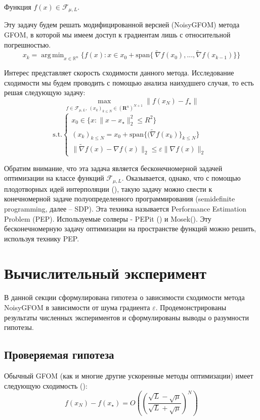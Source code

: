\documentclass{article}
\DeclareMathOperator*{\argmin}{arg\,min}
\begin{document}
Функция $f(x) \in \mathcal{F}_{\mu, L}$.

Эту задачу будем решать модифицированной версией (NoisyGFOM) метода GFOM, в которой мы имеем доступ к градиентам лишь с относительной погрешностью.
\[x_k = \argmin_{x \in \mathbb{R}^n}\{f(x): x \in x_0 + \text{span}\{\ \widetilde{\nabla} f(x_0), ..., \widetilde{\nabla} f(x_{k-1})\}\} \tag{NoisyGFOM}\]

Интерес представляет скорость сходимости данного метода. Исследование сходимости мы будем проводить с помощью анализа наихудшего случая, то есть решая следующую задачу:
\begin{equation}
    \max_{f \in \mathcal{F}_{\mu, L}, \ (x_k)_{k \le N} \in (\mathbf{R}^n)^{N+1}} \|f(x_N) - f_{\star}\|  
\end{equation}
    \[\text{s.t.} 
    \begin{cases}
    x_0 \in \{x: \|x-x_{\star}\|_2^2 
    \le R^2\} \\
    (x_k)_{k \le N} = x_0 + \text{span} \{ (\widetilde{\nabla} f(x_{k})\}_{k \le N} \} \\
    \|\widetilde{\nabla} f(x) - \nabla f(x)\|_2 \leq \varepsilon\|\nabla f(x)\|_2 \
\end{cases}\]

Обратим внимание, что эта задача является бесконечномерной задачей оптимизации на  классе функций $\mathcal{F}_{\mu, L}$. Оказывается, однако, что с помощью плодотворных идей интерполяции (\cite{taylor2017smooth}), такую задачу можно свести к конечномерной задаче полуопределенного программирования (semidefinite programming, далее -- SDP). Эта техника называется Performance Estimation Problem (PEP). Используемые солверы - PEPit (\cite{goujaud2022pepit}) и Mosek(\cite{aps2019mosek}).
Эту бесконечномерную задачу оптимизации на пространстве функций можно решить, используя технику PEP.

\section{Вычислительный эксперимент}
В данной секции сформулирована гипотеза о зависимости сходимости метода NoisyGFOM в зависимости от шума градиента $\varepsilon$. Продемонстрированы результаты численных экспериментов и сформулированы выводы о разумности гипотезы.

\subsection{Проверяемая гипотеза}
Обычный GFOM (как и многие другие ускоренные методы оптимизации) имеет следующую сходимость (\cite{convex_opt_mipt}):
\begin{equation} \label{GFOMconverge}
    f(x_N) - f(x_{\star}) = O\left(\left(\frac{\sqrt{L} - \sqrt{\mu}}{\sqrt{L} + \sqrt{\mu}}\right)^N\right) 
\end{equation}
\end{document}
